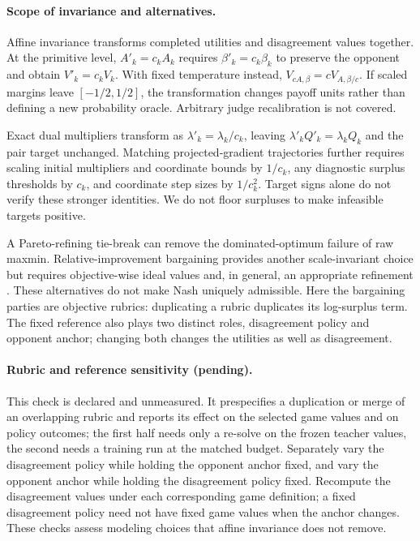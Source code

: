 \documentclass{article}
\theoremstyle{remark}
\theoremstyle{plain}
\begin{document}
\paragraph{Scope of invariance and alternatives.}
Affine invariance transforms completed utilities and disagreement values together. At the primitive level, $A'_k=c_k A_k$ requires $\beta'_k=c_k\beta_k$ to preserve the opponent and obtain $V'_k=c_kV_k$. With fixed temperature instead, $V_{cA,\beta}=cV_{A,\beta/c}$. If scaled margins leave $[-1/2,1/2]$, the transformation changes payoff units rather than defining a new probability oracle. Arbitrary judge recalibration is not covered.

Exact dual multipliers transform as $\lambda'_k=\lambda_k/c_k$, leaving $\lambda'_kQ'_k=\lambda_kQ_k$ and the pair target unchanged. Matching projected-gradient trajectories further requires scaling initial multipliers and coordinate bounds by $1/c_k$, any diagnostic surplus thresholds by $c_k$, and coordinate step sizes by $1/c_k^2$. Target signs alone do not verify these stronger identities. We do not floor surpluses to make infeasible targets positive.

A Pareto-refining tie-break can remove the dominated-optimum failure of raw maxmin. Relative-improvement bargaining provides another scale-invariant choice but requires objective-wise ideal values and, in general, an appropriate refinement \citep{kalai1975,han2026fair}. These alternatives do not make Nash uniquely admissible. Here the bargaining parties are objective rubrics: duplicating a rubric duplicates its log-surplus term. The fixed reference also plays two distinct roles, disagreement policy and opponent anchor; changing both changes the utilities as well as disagreement.

\paragraph{Rubric and reference sensitivity (pending).}
\label{app:rubric-reference-sensitivity}
This check is declared and unmeasured. It prespecifies a duplication or merge of an overlapping rubric and reports its effect on the selected game values and on policy outcomes; the first half needs only a re-solve on the frozen teacher values, the second needs a training run at the matched budget. Separately vary the disagreement policy while holding the opponent anchor fixed, and vary the opponent anchor while holding the disagreement policy fixed. Recompute the disagreement values under each corresponding game definition; a fixed disagreement policy need not have fixed game values when the anchor changes. These checks assess modeling choices that affine invariance does not remove.
\end{document}
